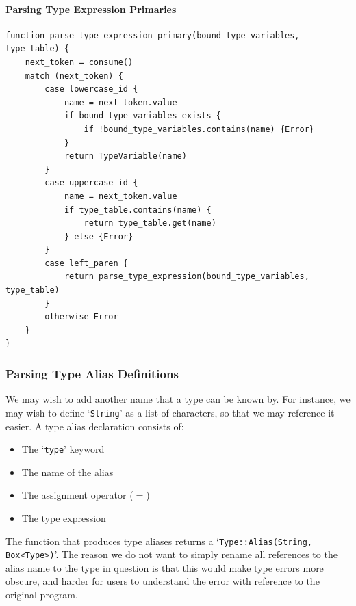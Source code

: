 \paragraph{Parsing Type Expression Primaries}
\begin{verbatim}
function parse_type_expression_primary(bound_type_variables, type_table) {
    next_token = consume()
    match (next_token) {
        case lowercase_id {
            name = next_token.value
            if bound_type_variables exists {
                if !bound_type_variables.contains(name) {Error}
            }
            return TypeVariable(name)
        }
        case uppercase_id {
            name = next_token.value
            if type_table.contains(name) {
                return type_table.get(name)
            } else {Error}
        }
        case left_paren {
            return parse_type_expression(bound_type_variables, type_table)
        }
        otherwise Error
    }
}
\end{verbatim}

\subsubsection{Parsing Type Alias Definitions} 
We may wish to add another name that a type can be known by. For instance, we may wish to define `\verb|String|' as a list of characters, so that we may reference it easier. A type alias declaration consists of:
\begin{itemize}
    \item The `\verb|type|' keyword
    \item The name of the alias
    \item The assignment operator ($=$)
    \item The type expression
\end{itemize}
The function that produces type aliases returns a `\verb|Type::Alias(String, Box<Type>)|'. The reason we do not want to simply rename all references to the alias name to the type in question is that this would make type errors more obscure, and harder for users to understand the error with reference to the original program.

